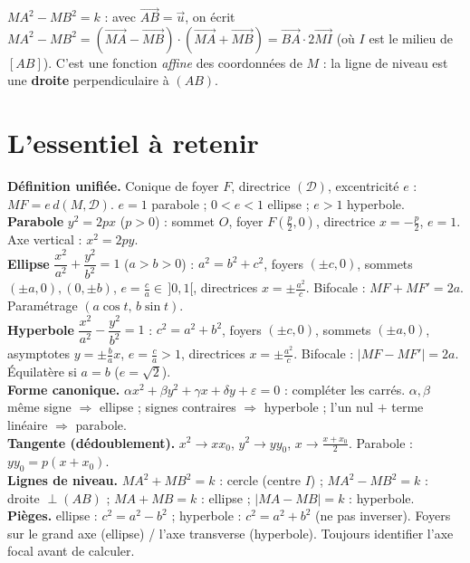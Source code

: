 \begin{exemple}
$MA^{2}-MB^{2}=k$ : avec $\overrightarrow{AB}=\vec u$, on écrit
$MA^{2}-MB^{2}=(\overrightarrow{MA}-\overrightarrow{MB})\cdot(\overrightarrow{MA}+\overrightarrow{MB})
=\overrightarrow{BA}\cdot 2\overrightarrow{MI}$ (où $I$ est le milieu de $[AB]$). C'est une
fonction \emph{affine} des coordonnées de $M$ : la ligne de niveau est une \textbf{droite}
perpendiculaire à $(AB)$.
\end{exemple}

\section{L'essentiel à retenir}

\begin{synthese}
\textbf{Définition unifiée.} Conique de foyer $F$, directrice $(\mathcal D)$, excentricité
$e$ : $MF=e\,d(M,\mathcal D)$. $e=1$ parabole ; $0<e<1$ ellipse ; $e>1$ hyperbole.\\[4pt]
\textbf{Parabole} $y^{2}=2px$ ($p>0$) : sommet $O$, foyer $F\!\left(\tfrac p2,0\right)$,
directrice $x=-\tfrac p2$, $e=1$. Axe vertical : $x^{2}=2py$.\\[4pt]
\textbf{Ellipse} $\dfrac{x^{2}}{a^{2}}+\dfrac{y^{2}}{b^{2}}=1$ ($a>b>0$) :
$a^{2}=b^{2}+c^{2}$, foyers $(\pm c,0)$, sommets $(\pm a,0),(0,\pm b)$,
$e=\tfrac ca\in\,]0,1[$, directrices $x=\pm\tfrac{a^{2}}c$. Bifocale : $MF+MF'=2a$.
Paramétrage $(a\cos t,\,b\sin t)$.\\[4pt]
\textbf{Hyperbole} $\dfrac{x^{2}}{a^{2}}-\dfrac{y^{2}}{b^{2}}=1$ : $c^{2}=a^{2}+b^{2}$,
foyers $(\pm c,0)$, sommets $(\pm a,0)$, asymptotes $y=\pm\tfrac ba x$, $e=\tfrac ca>1$,
directrices $x=\pm\tfrac{a^{2}}c$. Bifocale : $|MF-MF'|=2a$. Équilatère si $a=b$
($e=\sqrt2$).\\[4pt]
\textbf{Forme canonique.} $\alpha x^{2}+\beta y^{2}+\gamma x+\delta y+\varepsilon=0$ :
compléter les carrés. $\alpha,\beta$ même signe $\Rightarrow$ ellipse ; signes contraires
$\Rightarrow$ hyperbole ; l'un nul $+$ terme linéaire $\Rightarrow$ parabole.\\[4pt]
\textbf{Tangente (dédoublement).} $x^{2}\!\to\! xx_0$, $y^{2}\!\to\! yy_0$,
$x\!\to\!\tfrac{x+x_0}2$. Parabole : $yy_0=p(x+x_0)$.\\[4pt]
\textbf{Lignes de niveau.} $MA^{2}+MB^{2}=k$ : cercle (centre $I$) ; $MA^{2}-MB^{2}=k$ :
droite $\perp(AB)$ ; $MA+MB=k$ : ellipse ; $|MA-MB|=k$ : hyperbole.\\[4pt]
\textbf{Pièges.} ellipse : $c^{2}=a^{2}-b^{2}$ ; hyperbole : $c^{2}=a^{2}+b^{2}$ (ne pas
inverser). Foyers sur le grand axe (ellipse) / l'axe transverse (hyperbole). Toujours
identifier l'axe focal avant de calculer.
\end{synthese}

